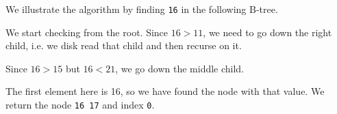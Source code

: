 \documentclass[a4paper, openany]{memoir}
\begin{document}
\noindent We illustrate the algorithm by finding \texttt{16} in the following B-tree.
\begin{center}
\end{center}
We start checking from the root. Since $16 > 11$, we need to go down the right child, i.e. we disk read that child and then recurse on it.
\begin{center}
\end{center}
Since $16 > 15$ but $16 < 21$, we go down the middle child.
\begin{center}
\end{center}
The first element here is 16, so we have found the node with that value. We return the node \texttt{16 17} and index \texttt{0}.
\end{document}

